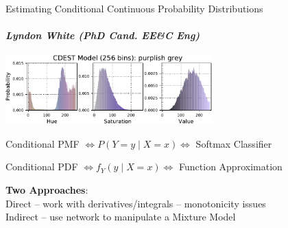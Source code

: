 \documentclass[dvipsnames]{beamer}
\begin{document}
\begin{frame}{Estimating Conditional Continuous Probability Distributions}
	\framesubtitle{\emph{\normalsize Lyndon White (PhD Cand. EE\&C Eng)}}
	\centering
	\includegraphics[width=0.6\textwidth]{gru256purplishgrey}

	\raggedright

	Conditional PMF $\iff P(Y=y \mid X=x) \iff$ Softmax Classifier\\
	\vfill
	
	Conditional PDF $\iff f_Y(y \mid X=x)\iff $ Function Approximation\\
	\vfill 
	
	\alert{\textbf{Two Approaches}:} \\
	\alert{Direct} -- work with derivatives/integrals -- monotonicity issues\\
	\alert{Indirect} -- use network to manipulate a Mixture Model\\
	\vfill 
\end{frame}
\end{document}
